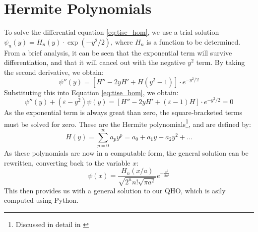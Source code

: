 \documentclass[a4paper]{article}
\begin{document}
\section{Hermite Polynomials}
To solve the differential equation \ref{eq:tise_hom}, we use a trial solution $\psi_n(y)=H_n(y)\cdot\exp(-y^2/2)$, where $H_n$ is a function to be determined. From a brief analysis, it can be seen that the exponential term will survive differentiation, and that it will cancel out with the negative $y^2$ term. By taking the second derivative, we obtain:
\begin{equation}
\psi''(y)=[H''-2yH'+H(y^2-1)]\cdot e^{-y^2/2}
\end{equation}
Substituting this into Equation \ref{eq:tise_hom}, we obtain:
\begin{equation}
\psi''(y)+(\varepsilon-y^2)\psi(y)=[H''-2yH'+(\varepsilon-1)H]\cdot e^{-y^2/2}=0
\end{equation}
As the exponential term is always great than zero, the square-bracketed terms must be solved for zero. These are the Hermite polynomials\footnote{Discussed in detail in \cite[\S1T1 $\sim$ p.57 ]{RefWorks:doc:606076f48f081b19e4859e9a}}, and are defined by:
\begin{equation}
H(y)=\sum^\infty_{p=0}a_py^p=a_0+a_1y+a_2y^2+...
\end{equation}
As these polynomials are now in a computable form, the general solution can be rewritten, converting back to the variable $x$:
\begin{equation}
\psi(x)=\frac{H_n(x/a)}{\sqrt{2^nn!\sqrt{\pi a^2}}}e^{-\frac{x^2}{2a^2}}
\end{equation}
This then provides us with a general solution to our QHO, which is asily computed using Python.
\end{document}
